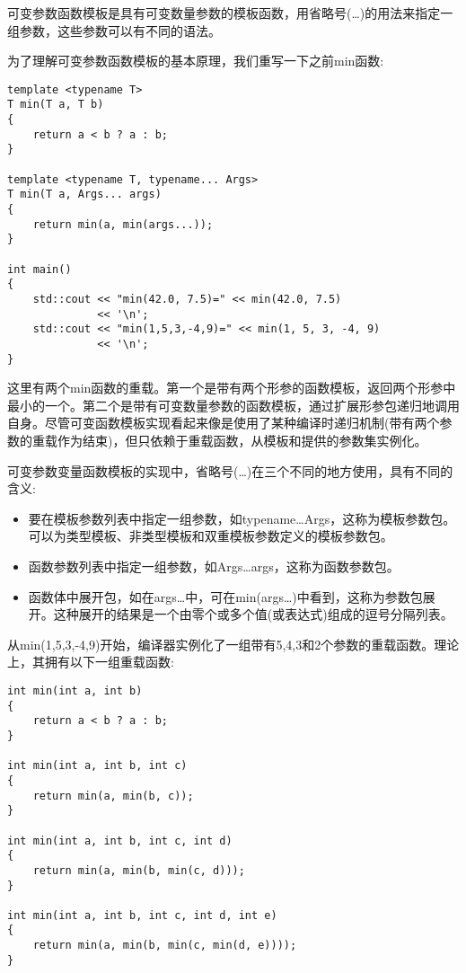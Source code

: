可变参数函数模板是具有可变数量参数的模板函数，用省略号(…)的用法来指定一组参数，这些参数可以有不同的语法。

为了理解可变参数函数模板的基本原理，我们重写一下之前min函数:

\begin{lstlisting}[style=styleCXX]
template <typename T>
T min(T a, T b)
{
	return a < b ? a : b;
}

template <typename T, typename... Args>
T min(T a, Args... args)
{
	return min(a, min(args...));
}

int main()
{
	std::cout << "min(42.0, 7.5)=" << min(42.0, 7.5)
	          << '\n';
	std::cout << "min(1,5,3,-4,9)=" << min(1, 5, 3, -4, 9)
	          << '\n';
}
\end{lstlisting}

这里有两个min函数的重载。第一个是带有两个形参的函数模板，返回两个形参中最小的一个。第二个是带有可变数量参数的函数模板，通过扩展形参包递归地调用自身。尽管可变函数模板实现看起来像是使用了某种编译时递归机制(带有两个参数的重载作为结束)，但只依赖于重载函数，从模板和提供的参数集实例化。

可变参数变量函数模板的实现中，省略号(…)在三个不同的地方使用，具有不同的含义:

\begin{itemize}
\item
要在模板参数列表中指定一组参数，如typename…Args，这称为模板参数包。可以为类型模板、非类型模板和双重模板参数定义的模板参数包。

\item
函数参数列表中指定一组参数，如Args…args，这称为函数参数包。

\item
函数体中展开包，如在args…中，可在min(args…)中看到，这称为参数包展开。这种展开的结果是一个由零个或多个值(或表达式)组成的逗号分隔列表。
\end{itemize}

从min(1,5,3,-4,9)开始，编译器实例化了一组带有5,4,3和2个参数的重载函数。理论上，其拥有以下一组重载函数:

\begin{lstlisting}[style=styleCXX]
int min(int a, int b)
{
	return a < b ? a : b;
}

int min(int a, int b, int c)
{
	return min(a, min(b, c));
}

int min(int a, int b, int c, int d)
{
	return min(a, min(b, min(c, d)));
}

int min(int a, int b, int c, int d, int e)
{
	return min(a, min(b, min(c, min(d, e))));
}
\end{lstlisting}

